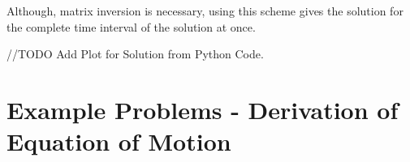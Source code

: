 Although, matrix inversion is necessary, using this scheme gives the solution for the complete time interval of the solution at once. %
 
//TODO Add Plot for Solution from Python Code.

\section{Example Problems - Derivation of Equation of Motion}
\cite[See][]{stutts_daniel_s_1995_4457929}